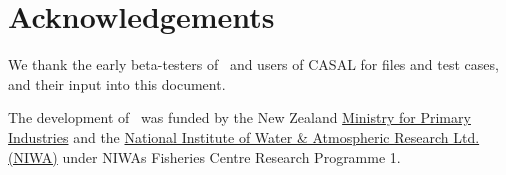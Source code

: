 \section{Acknowledgements\label{sec:acknowledgements}}

We thank the early beta-testers of \CNAME\ and users of CASAL \citep{1388} for files and test cases, and their input into this document.

The development of \CNAME\ was funded by the New Zealand \href{http://www.mpi.govt.nz}{Ministry for Primary Industries} and the \href{http://www.niwa.co.nz}{National Institute of Water \& Atmospheric Research Ltd. (NIWA)} under NIWAs Fisheries Centre Research Programme 1. 
